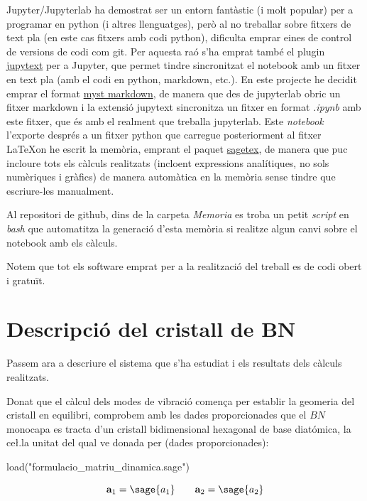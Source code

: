 \documentclass[12pt]{article} %
\let\vec\mathbf %
\begin{document}
{Jupyter/Jupyterlab ha demostrat ser un entorn fantàstic (i molt popular) per a programar en python (i altres llenguatges), però al no treballar sobre fitxers de text pla (en este cas fitxers amb codi python), dificulta emprar eines de control de versions de codi com git. Per aquesta raó s’ha emprat també el plugin \href{https://jupytext.readthedocs.io/en/latest/}{jupytext} per a Jupyter, que permet tindre sincronitzat el notebook amb un fitxer en text pla (amb el codi en python, markdown, etc.). En este projecte he decidit emprar el format \href{https://jupyterbook.org/content/myst.html}{myst markdown}, de manera que des de jupyterlab obric un fitxer markdown i la extensió jupytext sincronitza un fitxer en format \textit{.ipynb} amb este fitxer, que és amb el realment que treballa jupyterlab. Este \emph{notebook} l'exporte després a un fitxer python que carregue posteriorment al fitxer \LaTeX on he escrit la memòria, emprant el paquet \href{https://ctan.org/pkg/sagetex}{sagetex}, de manera que puc incloure tots els càlculs realitzats (incloent expressions analítiques, no sols numèriques i gràfics) de manera automàtica en la memòria sense tindre que escriure-les manualment.

Al repositori de github, dins de la carpeta \textit{Memoria} es troba un petit \textit{script} en \textit{bash} que automatitza la generació d'esta memòria si realitze algun canvi sobre el notebook amb els càlculs.

Notem que tot els software emprat per a la realització del treball es de codi obert i gratuït.


\newpage
\section{Descripció del cristall de BN}

Passem ara a descriure el sistema que s'ha estudiat i els resultats dels càlculs realitzats.

Donat que el càlcul dels modes de vibració comen\c{c}a per establir la geomeria del cristall en equilibri, comprobem amb les dades proporcionades que el $BN$ monocapa es tracta d'un cristall bidimensional hexagonal de base diatómica, la ce\l.la unitat del qual ve donada per (dades proporcionades):

\begin{sagesilent}
load("formulacio_matriu_dinamica.sage")
\end{sagesilent}

\begin{equation}
\vec a_1=\sage{a_1}\qquad\vec a_2=\sage{a_2} 
\end{equation}

}
\end{document}
